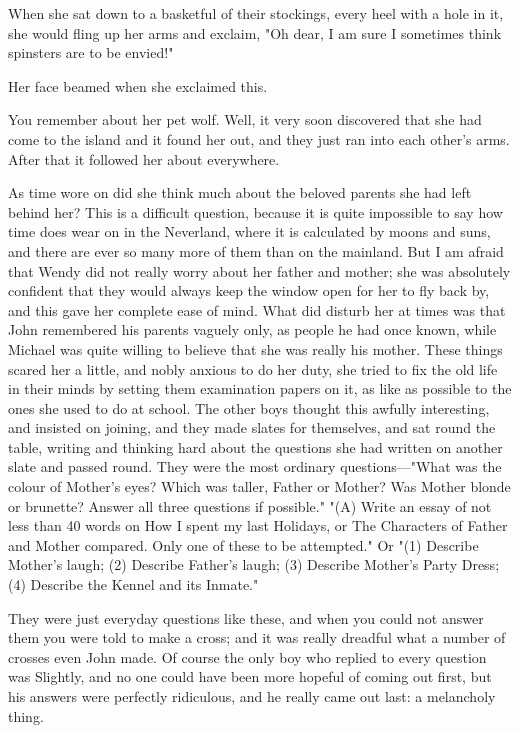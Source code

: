 When she sat down to a basketful of their stockings, every heel with a
hole in it, she would fling up her arms and exclaim, "Oh dear, I am sure I
sometimes think spinsters are to be envied!"


Her face beamed when she exclaimed this.


You remember about her pet wolf. Well, it very soon discovered that she
had come to the island and it found her out, and they just ran into each
other's arms. After that it followed her about everywhere.


As time wore on did she think much about the beloved parents she had left
behind her? This is a difficult question, because it is quite impossible
to say how time does wear on in the Neverland, where it is calculated by
moons and suns, and there are ever so many more of them than on the
mainland. But I am afraid that Wendy did not really worry about her father
and mother; she was absolutely confident that they would always keep the
window open for her to fly back by, and this gave her complete ease of
mind. What did disturb her at times was that John remembered his parents
vaguely only, as people he had once known, while Michael was quite willing
to believe that she was really his mother. These things scared her a
little, and nobly anxious to do her duty, she tried to fix the old life in
their minds by setting them examination papers on it, as like as possible
to the ones she used to do at school. The other boys thought this awfully
interesting, and insisted on joining, and they made slates for themselves,
and sat round the table, writing and thinking hard about the questions she
had written on another slate and passed round. They were the most ordinary
questions—"What was the colour of Mother's eyes? Which was taller,
Father or Mother? Was Mother blonde or brunette? Answer all three
questions if possible." "(A) Write an essay of not less than 40 words on
How I spent my last Holidays, or The Characters of Father and Mother
compared. Only one of these to be attempted." Or "(1) Describe Mother's
laugh; (2) Describe Father's laugh; (3) Describe Mother's Party Dress; (4)
Describe the Kennel and its Inmate."


They were just everyday questions like these, and when you could not
answer them you were told to make a cross; and it was really dreadful what
a number of crosses even John made. Of course the only boy who replied to
every question was Slightly, and no one could have been more hopeful of
coming out first, but his answers were perfectly ridiculous, and he really
came out last: a melancholy thing.


